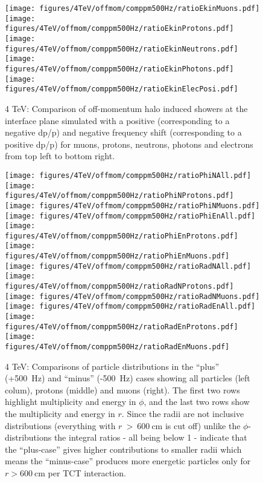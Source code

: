 \begin{figure}%
\begin{center}
  \texttt{[image: figures/4TeV/offmom/comppm500Hz/ratioEkinMuons.pdf]}
  \texttt{[image: figures/4TeV/offmom/comppm500Hz/ratioEkinProtons.pdf]}
  \texttt{[image: figures/4TeV/offmom/comppm500Hz/ratioEkinNeutrons.pdf]}
  \texttt{[image: figures/4TeV/offmom/comppm500Hz/ratioEkinPhotons.pdf]}
  \texttt{[image: figures/4TeV/offmom/comppm500Hz/ratioEkinElecPosi.pdf]}
\end{center}
\vspace{-0.6cm}
 \caption{4 TeV: Comparison of off-momentum halo induced showers at the interface plane simulated with a positive (corresponding to a negative dp/p) and negative frequency shift (corresponding to a positive dp/p) for muons, protons, neutrons, photons and electrons from top left to bottom right.
  \label{compPM_ekin}}
\end{figure}

\begin{figure}%
\begin{center}
  \texttt{[image: figures/4TeV/offmom/comppm500Hz/ratioPhiNAll.pdf]}
  \texttt{[image: figures/4TeV/offmom/comppm500Hz/ratioPhiNProtons.pdf]}
  \texttt{[image: figures/4TeV/offmom/comppm500Hz/ratioPhiNMuons.pdf]}
  \texttt{[image: figures/4TeV/offmom/comppm500Hz/ratioPhiEnAll.pdf]}
  \texttt{[image: figures/4TeV/offmom/comppm500Hz/ratioPhiEnProtons.pdf]}
  \texttt{[image: figures/4TeV/offmom/comppm500Hz/ratioPhiEnMuons.pdf]}
  \texttt{[image: figures/4TeV/offmom/comppm500Hz/ratioRadNAll.pdf]}
  \texttt{[image: figures/4TeV/offmom/comppm500Hz/ratioRadNProtons.pdf]}
  \texttt{[image: figures/4TeV/offmom/comppm500Hz/ratioRadNMuons.pdf]}
  \texttt{[image: figures/4TeV/offmom/comppm500Hz/ratioRadEnAll.pdf]}
  \texttt{[image: figures/4TeV/offmom/comppm500Hz/ratioRadEnProtons.pdf]}
  \texttt{[image: figures/4TeV/offmom/comppm500Hz/ratioRadEnMuons.pdf]}
\end{center}
\vspace{-0.6cm}
\caption{4 TeV: Comparisons of particle distributions in the ``plus'' (+500~Hz) and ``minus'' (-500~Hz) cases showing all particles (left colum), protons (middle) and muons (right). 
The first two rows highlight multiplicity and energy in $\phi$, and the last two rows show the multiplicity and energy in $r$. Since the radii are not inclusive distributions (everything with $r~>~600~$cm is cut off) unlike the $\phi$-distributions the integral ratios - all being below 1 - indicate that the ``plus-case'' gives higher contributions to smaller radii which means the ``minus-case'' produces more energetic particles only for $r > 600~$cm per TCT interaction. 
  \label{compPM_phien}}
\end{figure}
\newpage


